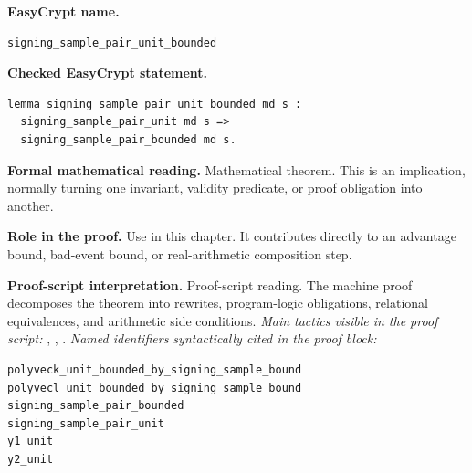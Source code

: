 \begin{formaltheorem}
\noindent\textbf{EasyCrypt name.}
\begin{lstlisting}[language=EasyCrypt,basicstyle=\ttfamily\scriptsize]
signing_sample_pair_unit_bounded
\end{lstlisting}
\noindent\textbf{Checked EasyCrypt statement.}
\begin{lstlisting}[language=EasyCrypt,basicstyle=\ttfamily\scriptsize]
lemma signing_sample_pair_unit_bounded md s :
  signing_sample_pair_unit md s =>
  signing_sample_pair_bounded md s.
\end{lstlisting}
\noindent\textbf{Formal mathematical reading.}
Mathematical theorem. This is an implication, normally turning one invariant, validity predicate, or proof obligation into another.

\noindent\textbf{Role in the proof.}
Use in this chapter. It contributes directly to an advantage bound, bad-event bound, or real-arithmetic composition step.

\noindent\textbf{Proof-script interpretation.}
Proof-script reading. The machine proof decomposes the theorem into rewrites, program-logic obligations, relational equivalences, and arithmetic side conditions.
\emph{Main tactics visible in the proof script:} , , .
\emph{Named identifiers syntactically cited in the proof block:}
\begin{lstlisting}[language=EasyCrypt,basicstyle=\ttfamily\scriptsize]
polyveck_unit_bounded_by_signing_sample_bound
polyvecl_unit_bounded_by_signing_sample_bound
signing_sample_pair_bounded
signing_sample_pair_unit
y1_unit
y2_unit
\end{lstlisting}

\end{formaltheorem}

